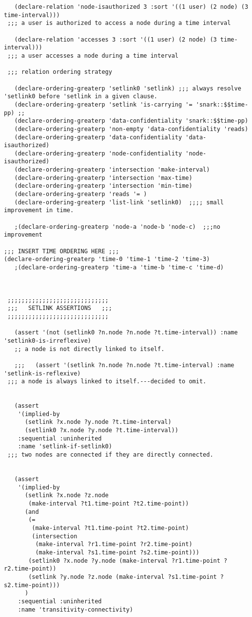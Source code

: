 \begin{lstlisting}
   (declare-relation 'node-isauthorized 3 :sort '((1 user) (2 node) (3 time-interval)))
 ;;; a user is authorized to access a node during a time interval

   (declare-relation 'accesses 3 :sort '((1 user) (2 node) (3 time-interval)))
 ;;; a user accesses a node during a time interval

 ;;; relation ordering strategy

   (declare-ordering-greaterp 'setlink0 'setlink) ;;; always resolve 'setlink0 before 'setlink in a given clause.
   (declare-ordering-greaterp 'setlink 'is-carrying '= 'snark::$$time-pp) ;;
   (declare-ordering-greaterp 'data-confidentiality 'snark::$$time-pp)
   (declare-ordering-greaterp 'non-empty 'data-confidentiality 'reads)
   (declare-ordering-greaterp 'data-confidentiality 'data-isauthorized)
   (declare-ordering-greaterp 'node-confidentiality 'node-isauthorized)
   (declare-ordering-greaterp 'intersection 'make-interval)
   (declare-ordering-greaterp 'intersection 'max-time)
   (declare-ordering-greaterp 'intersection 'min-time)
   (declare-ordering-greaterp 'reads '= )
   (declare-ordering-greaterp 'list-link 'setlink0)  ;;;; small improvement in time.

   ;(declare-ordering-greaterp 'node-a 'node-b 'node-c)  ;;;no improvement

;;; INSERT TIME ORDERING HERE ;;;
(declare-ordering-greaterp 'time-0 'time-1 'time-2 'time-3)
   ;(declare-ordering-greaterp 'time-a 'time-b 'time-c 'time-d)



 ;;;;;;;;;;;;;;;;;;;;;;;;;;;;;
 ;;;   SETLINK ASSERTIONS   ;;;
 ;;;;;;;;;;;;;;;;;;;;;;;;;;;;;

   (assert '(not (setlink0 ?n.node ?n.node ?t.time-interval)) :name 'setlink0-is-irreflexive)
   ;; a node is not directly linked to itself.

   ;;;   (assert '(setlink ?n.node ?n.node ?t.time-interval) :name 'setlink-is-reflexive)
 ;;; a node is always linked to itself.---decided to omit.


   (assert
    '(implied-by
      (setlink ?x.node ?y.node ?t.time-interval)
      (setlink0 ?x.node ?y.node ?t.time-interval))
    :sequential :uninherited
    :name 'setlink-if-setlink0)
 ;;; two nodes are connected if they are directly connected.


   (assert
    '(implied-by
      (setlink ?x.node ?z.node
       (make-interval ?t1.time-point ?t2.time-point))
      (and
       (=
        (make-interval ?t1.time-point ?t2.time-point)
        (intersection
         (make-interval ?r1.time-point ?r2.time-point)
         (make-interval ?s1.time-point ?s2.time-point)))
       (setlink0 ?x.node ?y.node (make-interval ?r1.time-point ?r2.time-point))
       (setlink ?y.node ?z.node (make-interval ?s1.time-point ?s2.time-point)))
      )
    :sequential :uninherited
    :name 'transitivity-connectivity)


\end{lstlisting}
